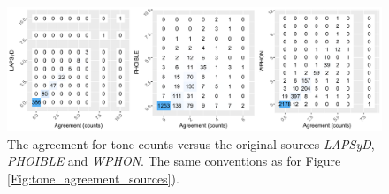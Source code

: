 \documentclass[twoside,twocolumn]{article}
\begin{document}
\begin{figure}[h]
  \centering
  \includegraphics[width=\textwidth]{../../code/figures/tone_agreement_with_sources_counts}
  \caption{The agreement for tone counts versus the original sources \textit{LAPSyD}, \textit{PHOIBLE} and \textit{WPHON}. The same conventions as for Figure \ref{Fig:tone_agreement_sources}).}
  \label{Fig:tone_agreement_with_sources_counts}
\end{figure}
\end{document}
